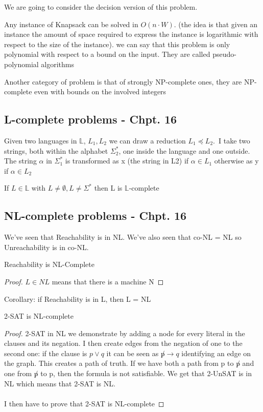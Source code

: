\begin{proposition}
    We are going to consider the decision version of this problem.
\end{proposition}
\begin{theorem}[9.4]
    Any instance of Knapsack can be solved in $O(n\cdot W)$. (the idea is that given an instance the amount of space required to express the instance is logarithmic with respect to the size of the instance). we can say that this problem is only polynomial with respect to a bound on the input. They are called pseudo-polynomial algorithms
\end{theorem}
Another category of problem is that of strongly NP-complete ones, they are NP-complete even with bounds on the involved integers

\subsection{L-complete problems - Chpt. 16}
Given two languages in $\mathbb{L}$, $L_1, L_2$ we can draw a reduction $L_1 \preceq L_2$.\
I take two strings, both within the alphabet $\Sigma_2^*$, one inside the language and one outside. The string $\alpha$ in $\Sigma_1^*$ is transformed as x (the string in L2) if $\alpha \in L_1$ otherwise as y if $\alpha \in L_2$
\begin{theorem}
    If $L \in \mathbb{L}$ with $L\neq \emptyset, L \neq \Sigma^*$ then L is $\mathbb{L}$-complete
\end{theorem}
\subsection{NL-complete problems - Chpt. 16}
We've seen that Reachability is in NL. We've also seen that co-NL = NL so Unreachability is in co-NL.
\begin{theorem}
    Reachability is NL-Complete
    \begin{proof}
        $L \in NL$ means that there is a machine N 
    \end{proof}
\end{theorem}
Corollary: if Reachability is in L, then L = NL

\begin{theorem}
    2-SAT is NL-complete
    \begin{proof}
        2-SAT in NL we demonstrate by adding a node for every literal in the clauses and its negation. I then create edges from the negation of one to the second one: if the clause is $p \vee q$ it can be seen as $\not p \rightarrow q$ identifying an edge on the graph. This creates a path of truth. If we have both a path from p to $\not p$ and one from $\not p$ to p, then the formula is not satisfiable. We get that 2-UnSAT is in NL which means that 2-SAT is NL.\\\\
        I then have to prove that 2-SAT is NL-complete
    \end{proof}
\end{theorem}




